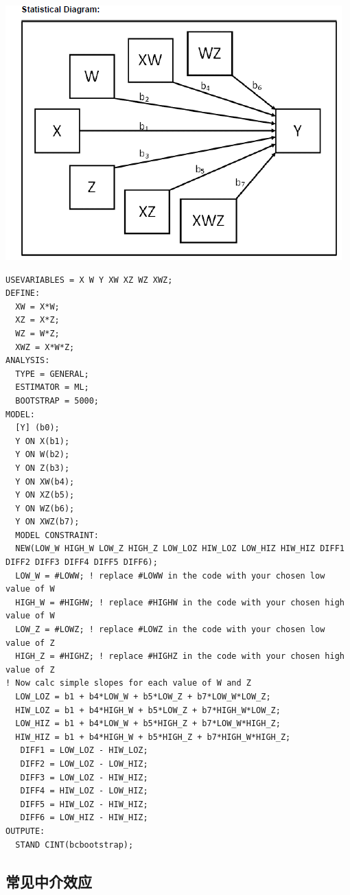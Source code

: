 \documentclass[
]{book}
\begin{document}
\includegraphics{figs/1116.png}

\begin{verbatim}
USEVARIABLES = X W Y XW XZ WZ XWZ;
DEFINE: 
  XW = X*W; 
  XZ = X*Z; 
  WZ = W*Z; 
  XWZ = X*W*Z;
ANALYSIS: 
  TYPE = GENERAL; 
  ESTIMATOR = ML; 
  BOOTSTRAP = 5000;
MODEL: 
  [Y] (b0); 
  Y ON X(b1); 
  Y ON W(b2); 
  Y ON Z(b3); 
  Y ON XW(b4); 
  Y ON XZ(b5); 
  Y ON WZ(b6); 
  Y ON XWZ(b7);
  MODEL CONSTRAINT: 
  NEW(LOW_W HIGH_W LOW_Z HIGH_Z LOW_LOZ HIW_LOZ LOW_HIZ HIW_HIZ DIFF1 DIFF2 DIFF3 DIFF4 DIFF5 DIFF6);
  LOW_W = #LOWW; ! replace #LOWW in the code with your chosen low value of W
  HIGH_W = #HIGHW; ! replace #HIGHW in the code with your chosen high value of W
  LOW_Z = #LOWZ; ! replace #LOWZ in the code with your chosen low value of Z
  HIGH_Z = #HIGHZ; ! replace #HIGHZ in the code with your chosen high value of Z
! Now calc simple slopes for each value of W and Z
  LOW_LOZ = b1 + b4*LOW_W + b5*LOW_Z + b7*LOW_W*LOW_Z;
  HIW_LOZ = b1 + b4*HIGH_W + b5*LOW_Z + b7*HIGH_W*LOW_Z;
  LOW_HIZ = b1 + b4*LOW_W + b5*HIGH_Z + b7*LOW_W*HIGH_Z;
  HIW_HIZ = b1 + b4*HIGH_W + b5*HIGH_Z + b7*HIGH_W*HIGH_Z;
   DIFF1 = LOW_LOZ - HIW_LOZ;
   DIFF2 = LOW_LOZ - LOW_HIZ;
   DIFF3 = LOW_LOZ - HIW_HIZ;
   DIFF4 = HIW_LOZ - LOW_HIZ;
   DIFF5 = HIW_LOZ - HIW_HIZ;
   DIFF6 = LOW_HIZ - HIW_HIZ;
OUTPUTE:
  STAND CINT(bcbootstrap);
\end{verbatim}

\hypertarget{normme}{%
\subsection{常见中介效应}\label{normme}}
\end{document}
